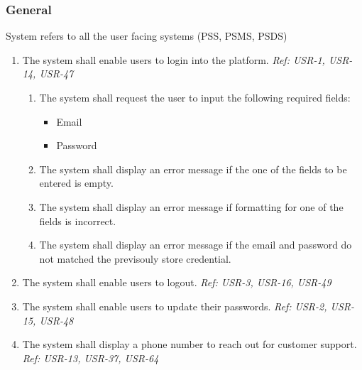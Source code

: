 \subsubsection{General}
System refers to all the user facing systems (PSS, PSMS, PSDS)
\begin{enumerate}[label=SY-\arabic*]
    \item The system shall enable users to login into the platform. 
    \newline \textit{Ref: USR-1, USR-14, USR-47}
    \begin{enumerate}[label=SY-1.\arabic*]
        \item The system shall request the user to input the following required 
        fields:
        \begin{itemize}
            \item Email
            \item Password
        \end{itemize}
        \item The system shall display an error message if the one of the fields 
        to be entered is empty.
        \item The system shall display an error message if formatting for one 
        of the fields is incorrect.
        \item The system shall display an error message if the email and 
        password do not matched the previsouly store credential.
    \end{enumerate}
    \item The system shall enable users to logout. 
    \newline \textit{Ref: USR-3, USR-16, USR-49}
    \item The system shall enable users to update their passwords.
    \newline \textit{Ref: USR-2, USR-15, USR-48}
    \item The system shall display a phone number to reach out for customer 
    support. 
    \newline \textit{Ref: USR-13, USR-37, USR-64}
\end{enumerate}
\pagebreak
